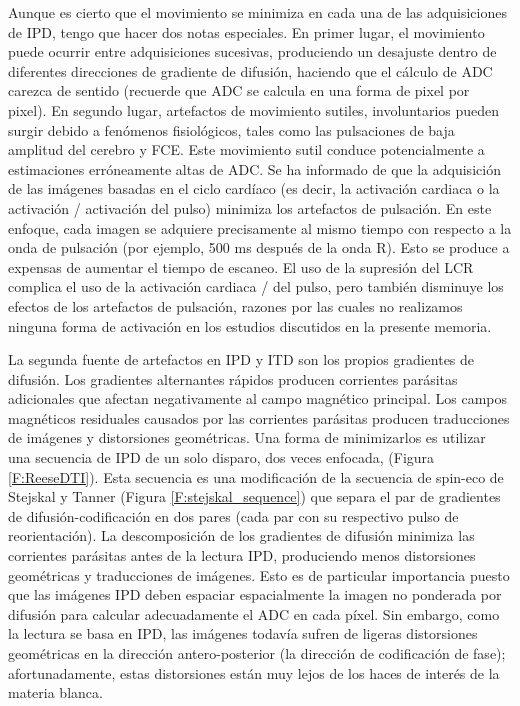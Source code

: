 Aunque es cierto que el movimiento se minimiza en cada una de las adquisiciones de IPD, tengo que hacer dos notas especiales. En primer lugar, el movimiento puede ocurrir entre adquisiciones sucesivas, produciendo un desajuste dentro de diferentes direcciones de gradiente de difusión, haciendo que el cálculo de ADC carezca de sentido (recuerde que ADC se calcula en una forma de pixel por pixel). En segundo lugar, artefactos de movimiento sutiles, involuntarios pueden surgir debido a fenómenos fisiológicos, tales como las pulsaciones de baja amplitud del cerebro y FCE. Este movimiento sutil conduce potencialmente a estimaciones erróneamente altas de ADC. Se ha informado de que la adquisición de las imágenes basadas en el ciclo cardíaco (es decir, la activación cardiaca o la activación / activación del pulso) minimiza los artefactos de pulsación. En este enfoque, cada imagen se adquiere precisamente al mismo tiempo con respecto a la onda de pulsación (por ejemplo, 500 ms después de la onda R). Esto se produce a expensas de aumentar el tiempo de escaneo. El uso de la supresión del LCR \cite{Concha_2005} complica el uso de la activación cardiaca / del pulso, pero también disminuye los efectos de los artefactos de pulsación, razones por las cuales no realizamos ninguna forma de activación en los estudios discutidos en la presente memoria.

La segunda fuente de artefactos en IPD y ITD son los propios gradientes de difusión. Los gradientes alternantes rápidos producen corrientes parásitas adicionales que afectan negativamente al campo magnético principal. Los campos magnéticos residuales causados por las corrientes parásitas producen traducciones de imágenes y distorsiones geométricas. Una forma de minimizarlos es utilizar una secuencia de IPD de un solo disparo, dos veces enfocada, \cite{Reese_2003} (Figura \ref{F:ReeseDTI}). Esta secuencia es una modificación de la secuencia de spin-eco de Stejskal y Tanner (Figura \ref{F:stejskal_sequence}) que separa el par de gradientes de difusión-codificación en dos pares (cada par con su respectivo pulso de reorientación). La descomposición de los gradientes de difusión minimiza las corrientes parásitas antes de la lectura IPD, produciendo menos distorsiones geométricas y traducciones de imágenes. Esto es de particular importancia puesto que las imágenes IPD deben espaciar espacialmente la imagen no ponderada por difusión para calcular adecuadamente el ADC en cada píxel. Sin embargo, como la lectura se basa en IPD, las imágenes todavía sufren de ligeras distorsiones geométricas en la dirección antero-posterior (la dirección de codificación de fase); afortunadamente, estas distorsiones están muy lejos de los haces de interés de la materia blanca.

